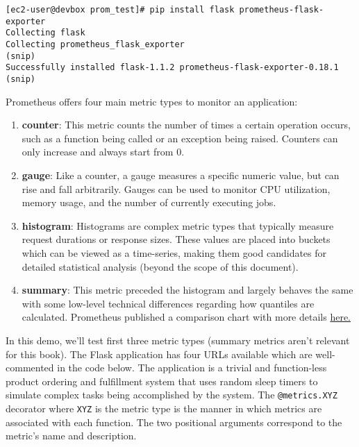 \begin{verbatim}
[ec2-user@devbox prom_test]# pip install flask prometheus-flask-exporter
Collecting flask
Collecting prometheus_flask_exporter
(snip)
Successfully installed flask-1.1.2 prometheus-flask-exporter-0.18.1 (snip)
\end{verbatim}

Prometheus offers four main metric types to monitor an application:

\begin{enumerate}
  \item \textbf{counter}: This metric counts the number of times a certain
    operation occurs, such as a function being called or an exception being
    raised. Counters can only increase and always start from 0.
  \item \textbf{gauge}: Like a counter, a gauge measures a specific numeric
    value, but can rise and fall arbitrarily. Gauges can be used to monitor
    CPU utilization, memory usage, and the number of currently executing jobs.
  \item \textbf{histogram}: Histograms are complex metric types that typically
    measure request durations or response sizes. These values are placed into
    buckets which can be viewed as a time-series, making them good candidates
    for detailed statistical analysis (beyond the scope of this document).
  \item \textbf{summary}: This metric preceded the histogram and largely behaves
    the same with some low-level technical differences regarding how quantiles
    are calculated. Prometheus published a comparison chart with more details
    \href{https://prometheus.io/docs/practices/histograms/}{here.}
\end{enumerate}

In this demo, we'll test first three metric types (summary metrics aren't
relevant for this book). The Flask application has four URLs available which
are well-commented in the code below. The application is a trivial and
function-less product ordering and fulfillment system that uses random
sleep timers to simulate complex tasks being accomplished by the system.
The \verb|@metrics.XYZ| decorator where \verb|XYZ| is the metric type is
the manner in which metrics are associated with each function. The two
positional arguments correspond to the metric's name and description.

